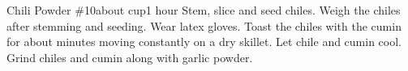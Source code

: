 \begin{recipe}{Chili Powder \#10}{about \unit[1]{cup}}{1 hour}
Stem, slice and seed chiles. Weigh the chiles after stemming and seeding.  Wear latex gloves.
Toast the chiles with the cumin for about \unit[3--4]{minutes} moving constantly on a dry skillet.  Let chile and cumin cool.
Grind chiles and cumin along with garlic powder.
\end{recipe}
